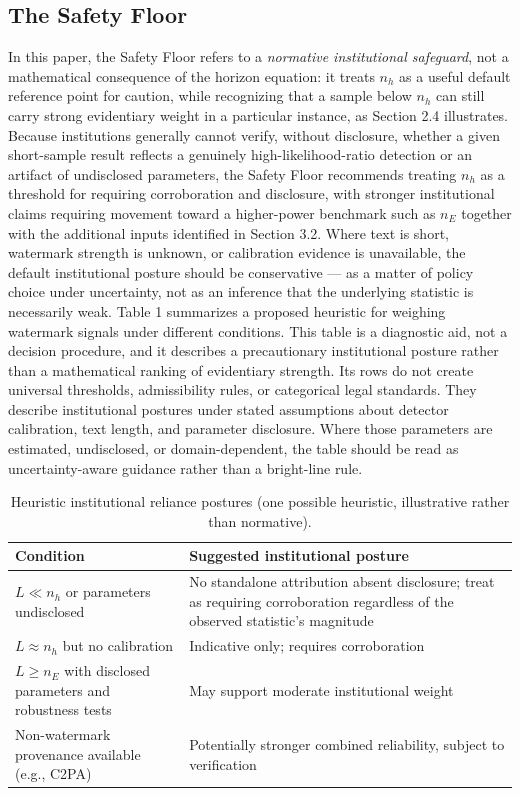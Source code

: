 \documentclass[11pt]{article}
\begin{document}
\subsection{The Safety Floor}
In this paper, the Safety Floor refers to a \emph{normative institutional
safeguard}, not a mathematical consequence of the horizon equation: it treats $n_h$
as a useful default reference point for caution, while recognizing that a sample
below $n_h$ can still carry strong evidentiary weight in a particular instance, as
Section 2.4 illustrates. Because institutions generally cannot verify, without
disclosure, whether a given short-sample result reflects a genuinely
high-likelihood-ratio detection or an artifact of undisclosed parameters, the
Safety Floor recommends treating $n_h$ as a threshold for requiring corroboration
and disclosure, with stronger institutional claims requiring movement toward a
higher-power benchmark such as $n_E$ together with the additional inputs
identified in Section 3.2. Where text is short, watermark strength is unknown, or
calibration evidence is unavailable, the default institutional posture should be
conservative --- as a matter of policy choice under uncertainty, not as an
inference that the underlying statistic is necessarily weak.
Table 1 summarizes a proposed heuristic for weighing watermark signals under
different conditions. This table is a diagnostic aid, not a decision procedure, and
it describes a precautionary institutional posture rather than a mathematical
ranking of evidentiary strength. Its rows do not create universal thresholds,
admissibility rules, or categorical legal standards. They describe institutional
postures under stated assumptions about detector calibration, text length, and
parameter disclosure. Where those parameters are estimated, undisclosed, or
domain-dependent, the table should be read as uncertainty-aware guidance rather
than a bright-line rule.
\begin{table}[h]
\centering
\caption{Heuristic institutional reliance postures (one possible heuristic,
illustrative rather than normative).}
\begin{tabular}{p{}p{}}
\toprule
\textbf{Condition} & \textbf{Suggested institutional posture}\\
\midrule
$L \ll n_h$ or parameters undisclosed & No standalone attribution absent
disclosure; treat as requiring corroboration regardless of the observed
statistic's magnitude\\
$L \approx n_h$ but no calibration & Indicative only; requires corroboration\\
$L \geq n_E$ with disclosed parameters and robustness tests & May support moderate
institutional weight\\
Non-watermark provenance available (e.g., C2PA) & Potentially stronger combined
reliability, subject to verification\\
\bottomrule
\end{tabular}
\end{table}
\end{document}
